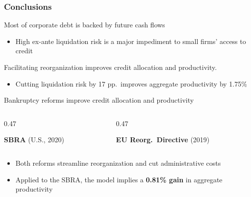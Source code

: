 \documentclass[aspectratio=169,xcolor=table]{beamer}
\begin{document}
\begin{frame}[label=conclusions2] \frametitle{Conclusions}
 

Most of corporate debt is backed by future cash flows
\begin{itemize} \small
    \item High ex-ante liquidation risk is a major impediment to small firms' access to credit
\end{itemize} \normalsize \vspace{3mm}


Facilitating reorganization improves credit allocation and productivity. 
\begin{itemize} \small
    \item Cutting liquidation risk by 17 pp.\ improves aggregate productivity by 1.75\%
\end{itemize} \normalsize \vspace{3mm}

 
Bankruptcy reforms improve credit allocation and productivity \vspace{-4mm}
 
\begin{columns}[T,onlytextwidth]
\begin{column}{0.47\textwidth}
\begin{tcolorbox}[colback=lightblue,colframe=primary,boxrule=1pt,arc=1.5mm,left=2mm,right=2mm,top=0.8mm,bottom=0.8mm,halign=center]
\small \textbf{\textcolor{primary}{SBRA}} (U.S., 2020)
\end{tcolorbox}
\end{column}
\begin{column}{0.47\textwidth}
\begin{tcolorbox}[colback=lightblue,colframe=primary,boxrule=1pt,arc=1.5mm,left=2mm,right=2mm,top=0.8mm,bottom=0.8mm,halign=center]
\small \textbf{\textcolor{primary}{EU Reorg.\ Directive}} (2019)
\end{tcolorbox}
\end{column}
\end{columns}   \vspace{3mm}
\begin{itemize}
    \item Both reforms streamline reorganization and cut administrative costs
    \item Applied to the SBRA, the model implies a \textbf{\textcolor{primary}{0.81\% gain}} in aggregate productivity
\end{itemize} \normalsize
 
\end{frame}
\end{document}
